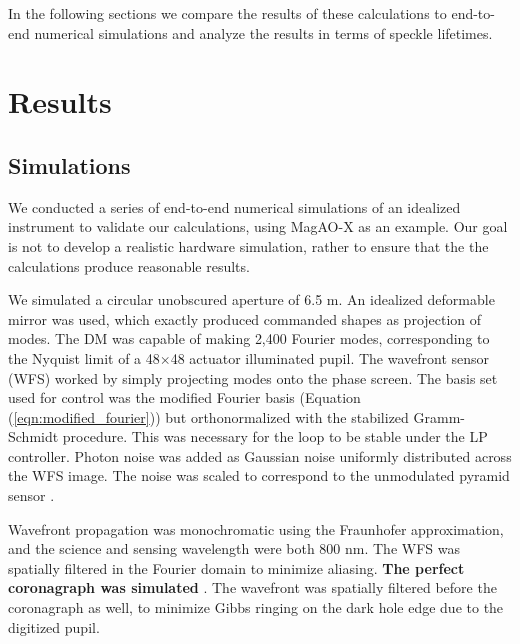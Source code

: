 \documentclass[10pt,preprint]{aastex631}
\begin{document}
In the following sections we compare the results of these calculations to end-to-end numerical simulations and analyze the results in terms of speckle lifetimes.




\section{Results}
\label{sec:results}


\subsection{Simulations}
\label{sec:simulations}
We conducted a series of end-to-end numerical simulations of an idealized instrument to validate our calculations, using MagAO-X \citep{2020SPIE11448E..4LM} as an example.  Our goal is not to develop a realistic hardware simulation, rather to ensure that the the calculations produce reasonable results. 

We simulated a circular unobscured aperture of 6.5 m.   An idealized deformable mirror was used, which exactly produced commanded shapes as projection of modes.  The DM was capable of making 2,400 Fourier modes, corresponding to the Nyquist limit of a 48$\times$48 actuator illuminated pupil.  The wavefront sensor (WFS) worked by simply projecting modes onto the phase screen.  The basis set used for control was the modified Fourier basis (Equation (\ref{eqn:modified_fourier})) but orthonormalized with the stabilized Gramm-Schmidt procedure.  This was necessary for the loop to be stable under the LP controller.  Photon noise was added as Gaussian noise uniformly distributed across the WFS image.  The noise was scaled to correspond to the unmodulated pyramid sensor  \cite[$\beta_p = \sqrt{2}$,][]{2005ApJ...629..592G}.

Wavefront propagation was monochromatic using the Fraunhofer approximation, and the science and sensing wavelength were both 800 nm.  The WFS was spatially filtered in the Fourier domain to minimize aliasing.  \textbf{The perfect coronagraph was simulated} \textbf{\citep{2006A&A...447..397C}}.  The wavefront was spatially filtered before the coronagraph as well, to minimize Gibbs ringing on the dark hole edge due to the digitized pupil.
\end{document}
